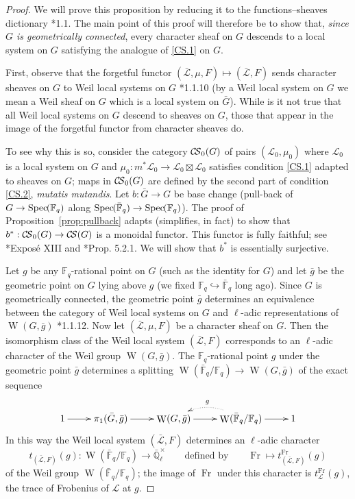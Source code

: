 \documentclass[11pt]{amsart}
\theoremstyle{plain}
\theoremstyle{definition}
\theoremstyle{remark}
\newcommand{\Spec}[1]{{\operatorname{Spec}\hskip-1pt( #1 )}}
\newcommand{\EE}{\mathbb{\bar Q}_\ell}
\newcommand{\bFq}{{\mathbb{\bar F}_q}}
\newcommand{\Fq}{{\mathbb{F}_q}}
\DeclareMathOperator{\Weil}{W}
\newcommand{\Frob}{{\operatorname{Fr}}}
\newcommand{\cdef}[1]{{{\color{cyan}#1}\index{#1}}}
\newcommand{\cs}[1]{{\mathcal{#1}}}
\newcommand{\gcs}[1]{{\mathcal{\bar #1}}}
\newcommand{\CS}{{\mathcal{C\hskip-1.8pt S}}}
\begin{document}
\begin{proof}
We will prove this proposition by reducing it to the functions--sheaves dictionary \cite{Laumon}*{1.1}. The main point of this proof will therefore be to show that, {\it since $G$ is geometrically connected}, every character sheaf on $G$ descends to a local system on $G$ satisfying the analogue of \ref{CS.1} on $G$. 

First, observe that the forgetful functor $(\gcs{L},\mu,F) \mapsto (\gcs{L},F)$ sends character sheaves on $G$ to Weil local systems on $G$ \cite{Deligne:Weil2}*{1.1.10} (by a Weil local system on $G$ we mean a Weil sheaf on $G$ which is a local system on ${\bar G}$). While is it not true that all Weil local systems on $G$ descend to sheaves on $G$, those that appear in the image of the forgetful functor from character sheaves do. 

To see why this is so, consider the category \cdef{$\CS_0(G)$} of pairs $(\cs{L}_0,\mu_0)$ where $\cs{L}_0$ is a local system on $G$ and $\mu_0: m^*\cs{L}_0 \to \cs{L}_0 \boxtimes \cs{L}_0$ satisfies condition \ref{CS.1} adapted to sheaves on $G$; maps in $\CS_0(G)$ are defined by the second part of condition \ref{CS.2}, {\it mutatis mutandis}. Let $b : {\bar G} \to G$ be base change (pull-back of $G\to \Spec{\Fq}$ along $\Spec{\bFq} \to \Spec{\Fq}$). The proof of Proposition~\ref{prop:pullback} adapts (simplifies, in fact) to show that  $b^* : \CS_0(G) \to \CS(G)$ is a monoidal functor. This functor is fully faithful; see \cite{SGA7.2}*{Expos\'e XIII} and \cite{BBD}*{Prop. 5.2.1}.  We will show that $b^*$ is essentially surjective. 

Let $g$ be any $\Fq$-rational point on $G$ (such as the identity for $G$) and let ${\bar g}$ be the geometric point on $G$ lying above $g$ (we fixed $\Fq \hookrightarrow \bFq$ long ago). Since $G$ is geometrically connected, the geometric point ${\bar g}$ determines an equivalence between the category of Weil local systems on $G$ and $\ell$-adic representations of $\Weil(G,{\bar g})$ \cite{Deligne:Weil2}*{1.1.12}. Now let $(\gcs{L},\mu,F)$ be a character sheaf on $G$. Then the isomorphism class of the Weil local system $(\gcs{L},F)$ corresponds to an $\ell$-adic character of the Weil group $\Weil(G, {\bar g})$. The $\Fq$-rational point $g$ under the geometric point ${\bar g}$ determines a splitting $\Weil(\bFq/\Fq)\to  \Weil(G,{\bar g})$ of the exact sequence
\[
\xymatrix{
1 \ar[r] & \pi_1({\bar G}, {\bar g}) \ar[r] &  \Weil(G,{\bar g}) \ar[r] & \ar@/_1pc/@{.>}[l]_{g} \Weil(\bFq/\Fq) \ar[r] & 1
}
\]
In this way the Weil local system $(\gcs{L},F)$ determines an $\ell$-adic character
\[
t_{(\gcs{L},F)}(g) : \Weil(\bFq/\Fq) \to \EE^\times \qquad \text{defined by}\qquad \Frob \mapsto t^\Frob_{(\gcs{L},F)}(g)
\]
of the Weil group $\Weil(\bFq/\Fq)$; the image of $\Frob$ under this character is $t^\Frob_\cs{L}(g)$, the trace of Frobenius of $\cs{L}$ at $g$.


\end{proof}
\end{document}
